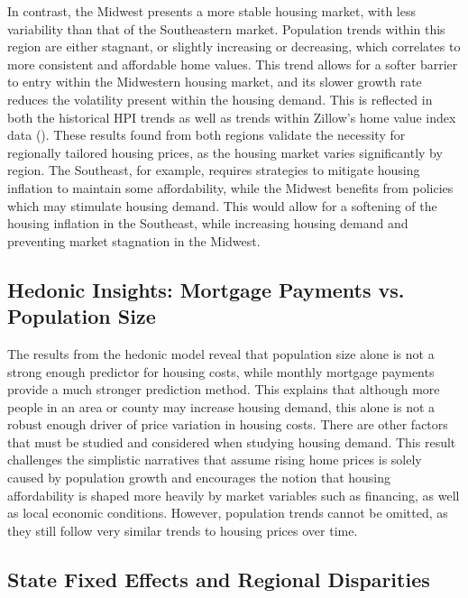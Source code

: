 \documentclass[journal,article,submit,pdftex,moreauthors]{Definitions/mdpi}
\begin{document}
In contrast, the Midwest presents a more stable housing market, with less variability than that of the Southeastern market. Population trends within this region are either stagnant, or slightly increasing or decreasing, which correlates to more consistent and affordable home values. This trend allows for a softer barrier to entry within the Midwestern housing market, and its slower growth rate reduces the volatility present within the housing demand. This is reflected in both the historical HPI trends as well as trends within Zillow’s home value index data (\citep{zillow_2024_housing}). These results found from both regions validate the necessity for regionally tailored housing prices, as the housing market varies significantly by region. The Southeast, for example, requires strategies to mitigate housing inflation to maintain some affordability, while the Midwest benefits from policies which may stimulate housing demand. This would allow for a softening of the housing inflation in the Southeast, while increasing housing demand and preventing market stagnation in the Midwest.

\subsection{Hedonic Insights: Mortgage Payments vs. Population Size}

The results from the hedonic model reveal that population size alone is not a strong enough predictor for housing costs, while monthly mortgage payments provide a much stronger prediction method. This explains that although more people in an area or county may increase housing demand, this alone is not a robust enough driver of price variation in housing costs. There are other factors that must be studied and considered when studying housing demand. This result challenges the simplistic narratives that assume rising home prices is solely caused by population growth and encourages the notion that housing affordability is shaped more heavily by market variables such as financing, as well as local economic conditions. However, population trends cannot be omitted, as they still follow very similar trends to housing prices over time.


\subsection{State Fixed Effects and Regional Disparities}
\end{document}
